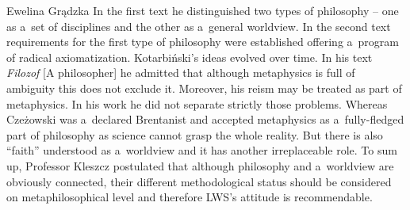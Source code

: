 \begin{editorialeng}{Ewelina Grądzka}
 In the first text he distinguished two types of philosophy – one as a~set of disciplines and the other as a~general worldview. In the second text requirements for the first type of philosophy were established offering a~program of radical axiomatization. Kotarbiński’s ideas evolved over time. In his text \textit{Filozof} [A philosopher] he admitted that although metaphysics is full of ambiguity this does not exclude it. Moreover, his reism may be treated as part of metaphysics. In his work he did not separate strictly those problems. Whereas Czeżowski was a~declared Brentanist and accepted metaphysics as a~fully-fledged part of philosophy as science cannot grasp the whole reality. But there is also ``faith'' understood as a~worldview and it has another irreplaceable role. To sum up, Professor Kleszcz postulated that although philosophy and a~worldview are obviously connected, their different methodological status should be considered on metaphilosophical level and therefore LWS’s attitude is recommendable.


\end{editorialeng}
